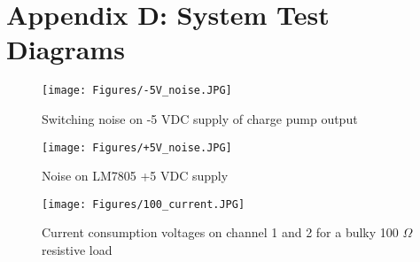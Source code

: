 \chapter{Appendix D: System Test Diagrams}



\begin{figure}[H]
    \centering
    \texttt{[image: Figures/-5V\_noise.JPG]}
    \caption{Switching noise on -5 VDC supply of charge pump output }
    \label{fig:-5V_noise}
\end{figure}


\begin{figure}[H]
    \centering
    \texttt{[image: Figures/+5V\_noise.JPG]}
    \caption{Noise on LM7805 +5 VDC supply}
    \label{fig:+5V_noise}
\end{figure}


\begin{figure}[H]
    \centering
    \texttt{[image: Figures/100\_current.JPG]}
    \caption{Current consumption voltages on channel 1 and 2 for a bulky 100 $\Omega$ resistive load}
    \label{fig:system_current}
\end{figure}